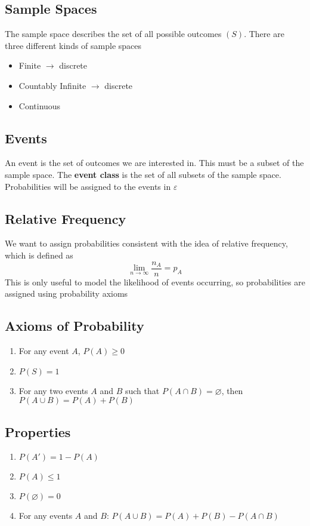 \documentclass[11pt]{article}
\begin{document}
\subsection{Sample Spaces}
The sample space describes the set of all possible outcomes  $(S)$. There are three different kinds of sample spaces
\begin{itemize}
\item Finite $\rightarrow$ discrete
\item Countably Infinite $\rightarrow$ discrete
\item Continuous
\end{itemize}

\subsection{Events}
An event is the set of outcomes we are interested in. This must be a subset of the sample space. The \textbf{event class} is the set of all subsets of the sample space. Probabilities will be assigned to the events in $\varepsilon$

\subsection{Relative Frequency}
We want to assign probabilities consistent with the idea of relative frequency, which is defined as 
$$\lim_{n \to \infty} \frac{n_A}{n} = p_A$$
This is only useful to model the likelihood of events occurring, so probabilities are assigned using probability axioms

\subsection{Axioms of Probability}
\begin{enumerate}
\item For any event $A$, $P(A) \geq 0$
\item $P(S) = 1$
\item For any two events $A$ and $B$ such that $P(A \cap B) = \varnothing$, then $ P(A\cup B) = P(A) + P(B)$
\end{enumerate}

\subsection{Properties}
\begin{enumerate}
\item $P(A') = 1 - P(A)$
\item $P(A) \leq 1$
\item $P(\varnothing) = 0$
\item For any events $A$ and $B$: $P(A \cup B) = P(A) + P (B) - P(A \cap B)$
\end{enumerate}
\end{document}
